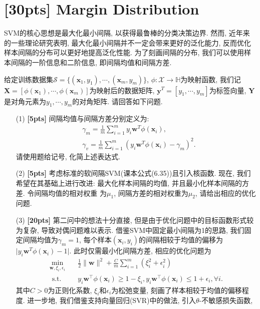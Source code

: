 \documentclass[a4paper,UTF8]{article}
\numberwithin{equation}{section}
\theoremstyle{definition}
\def \X {\boldsymbol{X}}
\def \Y {\boldsymbol{Y}}
\def \w {\boldsymbol{w}}
\def \y {\boldsymbol{y}}
\def \x {\boldsymbol{x}}
\begin{document}
\newpage

\section{[30pts] Margin Distribution}
SVM的核心思想是最大化最小间隔, 以获得最鲁棒的分类决策边界. 然而, 近年来的一些理论研究表明, 最大化最小间隔并不一定会带来更好的泛化能力,
反而优化样本间隔的分布可以更好地提高泛化性能. 为了刻画间隔的分布, 我们可以使用样本间隔的一阶信息和二阶信息, 即间隔均值和间隔方差. 

给定训练数据集$\mathcal{S} = \{(\x_1, y_1), \cdots, (\x_m, y_m)\}$, $\phi: \mathcal{X} \to \mathbb{H}$为映射函数, 
我们记$\X = \left[\phi(\x_1), \cdots, \phi(\x_m)\right]$为映射后的数据矩阵, $\y^T = [y_1, \cdots, y_m]$为标签向量, $\Y$是对角元素为$y_1, \cdots, y_m$的对角矩阵. 请回答如下问题.
\begin{enumerate}
    \item[(1)] \textbf{[5pts]} 间隔均值与间隔方差分别定义为:
    \begin{align*}
        &\gamma_m = \frac1m \sum_{i=1}^m y_i \w^T \phi(\x_i), \\
        &\gamma_v = \frac1m \sum_{i=1}^m (y_i\w^T\phi(\x_i) - \gamma_m)^2.
    \end{align*}
    请使用题给记号, 化简上述表达式.
    \item[(2)] \textbf{[5pts]} 考虑标准的软间隔SVM(课本公式(6.35))且引入核函数. 现在, 我们希望在其基础上进行改进: 最大化样本间隔的均值, 并且最小化样本间隔的方差. 令间隔均值的相对权重
    为$\mu_1$, 间隔方差的相对权重为$\mu_2$, 请给出相应的优化问题.
    \item[(3)] \textbf{[20pts]} 第二问中的想法十分直接, 但是由于优化问题中的目标函数形式较为复杂, 导致对偶问题难以表示. 借鉴SVM中固定最小间隔为1的思路, 我们固定间隔均值为$\gamma_m = 1$,
    每个样本$(\x_i, y_i)$的间隔相较于均值的偏移为$\lvert y_i \w^T \phi(\x_i) - 1\rvert$. 此时仅需最小化间隔方差, 相应的优化问题为
    \begin{align*}
        \min _{\boldsymbol{w}, \xi_i, \epsilon_i} & \quad \frac{1}{2}\|\boldsymbol{w}\|^2+ \frac{C}{m} \sum_{i=1}^m\left(\xi_i^2+\epsilon_i^2\right) \\
        \text { s.t. } & \quad y_i \boldsymbol{w}^{\top} \phi\left(\x_i\right) \geq 1-\xi_i, y_i \boldsymbol{w}^{\top} \phi\left(\x_i\right) \leq 1+\epsilon_i, \forall i .
    \end{align*}
    其中$C > 0$为正则化系数, $\xi_i$和$\epsilon_i$为松弛变量, 刻画了样本相较于均值的偏移程度. 进一步地, 我们借鉴支持向量回归(SVR)中的做法, 引入$\theta$-不敏感损失函数, 

\end{enumerate}
\end{document}
